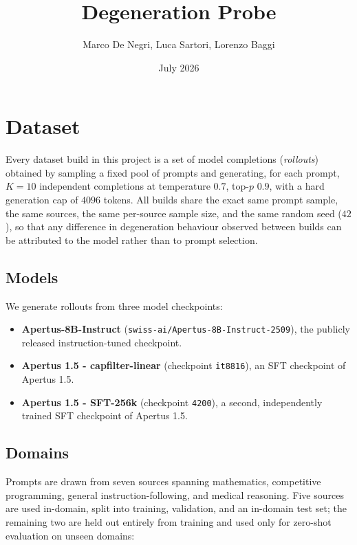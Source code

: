 \documentclass{article}
\title{Degeneration Probe}
\author{Marco De Negri, Luca Sartori, Lorenzo Baggi}
\date{July 2026}
\begin{document}
\maketitle

\section{Dataset}
\label{sec:dataset}

Every dataset build in this project is a set of model completions (\emph{rollouts})
obtained by sampling a fixed pool of prompts and generating, for each prompt,
$K=10$ independent completions at temperature $0.7$, top-$p$ $0.9$, with a
hard generation cap of $4096$ tokens. All builds share the exact same prompt
sample, the same sources, the same per-source sample size, and the same
random seed ($42$), so that any difference in degeneration behaviour
observed between builds can be attributed to the model rather than to
prompt selection.

\subsection{Models}

We generate rollouts from three model checkpoints:

\begin{itemize}
    \item \textbf{Apertus-8B-Instruct} (\texttt{swiss-ai/Apertus-8B-Instruct-2509}), the publicly released instruction-tuned checkpoint.
    \item \textbf{Apertus 1.5 - capfilter-linear} (checkpoint \texttt{it8816}), an SFT checkpoint of Apertus 1.5.
    \item \textbf{Apertus 1.5 - SFT-256k} (checkpoint \texttt{4200}), a second, independently trained SFT checkpoint of Apertus 1.5.
\end{itemize}

\subsection{Domains}

Prompts are drawn from seven sources spanning mathematics, competitive
programming, general instruction-following, and medical reasoning. Five
sources are used in-domain, split into training, validation, and an
in-domain test set; the remaining two are held out entirely from training
and used only for zero-shot evaluation on unseen domains:
\end{document}
